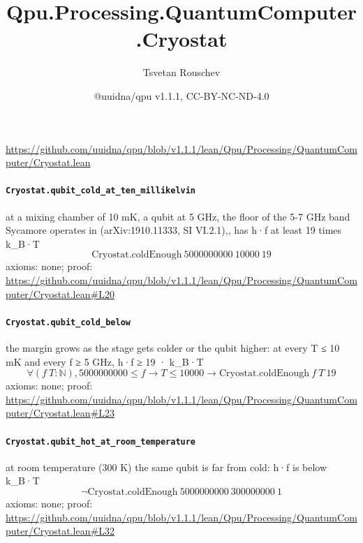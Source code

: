 \documentclass[11pt]{article}
\title{Qpu.Processing.QuantumComputer.Cryostat}
\author{Tsvetan Rouschev}
\date{@uuidna/qpu v1.1.1, CC-BY-NC-ND-4.0}
\begin{document}
\maketitle
\noindent\url{https://github.com/uuidna/qpu/blob/v1.1.1/lean/Qpu/Processing/QuantumComputer/Cryostat.lean}

\paragraph{\texttt{Cryostat.qubit\_cold\_at\_ten\_millikelvin}}
at a mixing chamber of 10 mK, a qubit at 5 GHz, the floor of the 5-7 GHz band Sycamore operates in (arXiv:1910.11333, SI VI.2.1),, has h·f at least 19 times k\_B·T
\[ \mathrm{Cryostat.coldEnough}\ 5000000000\ 10000\ 19 \]
\noindent axioms: none; proof: \url{https://github.com/uuidna/qpu/blob/v1.1.1/lean/Qpu/Processing/QuantumComputer/Cryostat.lean\#L20}

\paragraph{\texttt{Cryostat.qubit\_cold\_below}}
the margin grows as the stage gets colder or the qubit higher: at every T ≤ 10 mK and every f ≥ 5 GHz, h·f ≥ 19 · k\_B·T
\[ \forall (f\ T : \mathbb{N}), 5000000000 \le f \to T \le 10000 \to \mathrm{Cryostat.coldEnough}\ f\ T\ 19 \]
\noindent axioms: none; proof: \url{https://github.com/uuidna/qpu/blob/v1.1.1/lean/Qpu/Processing/QuantumComputer/Cryostat.lean\#L23}

\paragraph{\texttt{Cryostat.qubit\_hot\_at\_room\_temperature}}
at room temperature (300 K) the same qubit is far from cold: h·f is below k\_B·T
\[ \neg \mathrm{Cryostat.coldEnough}\ 5000000000\ 300000000\ 1 \]
\noindent axioms: none; proof: \url{https://github.com/uuidna/qpu/blob/v1.1.1/lean/Qpu/Processing/QuantumComputer/Cryostat.lean\#L32}
\end{document}
